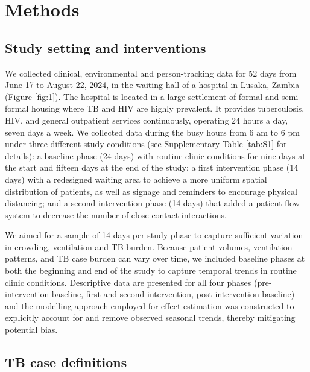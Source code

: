 \documentclass[11pt]{article}
\begin{document}
\section{Methods}\label{methods}

\subsection{Study setting and interventions}\label{study-setting-and-interventions}

We collected clinical, environmental and person-tracking data for 52 days from June 17 to August 22, 2024, in the waiting hall of a hospital in Lusaka, Zambia (Figure \ref{fig:1}). The hospital is located in a large settlement of formal and semi-formal housing where TB and HIV are highly prevalent. It provides tuberculosis, HIV, and general outpatient services continuously, operating 24 hours a day, seven days a week. We collected data during the busy hours from 6 am to 6 pm under three different study conditions (see Supplementary Table \ref{tab:S1} for details): a baseline phase (24 days) with routine clinic conditions for nine days at the start and fifteen days at the end of the study; a first intervention phase (14 days) with a redesigned waiting area to achieve a more uniform spatial distribution of patients, as well as signage and reminders to encourage physical distancing; and a second intervention phase (14 days) that added a patient flow system to decrease the number of close-contact interactions.

We aimed for a sample of 14 days per study phase to capture sufficient variation in crowding, ventilation and TB burden. Because patient volumes, ventilation patterns, and TB case burden can vary over time, we included baseline phases at both the beginning and end of the study to capture temporal trends in routine clinic conditions. Descriptive data are presented for all four phases (pre-intervention baseline, first and second intervention, post-intervention baseline) and the modelling approach employed for effect estimation was constructed to explicitly account for and remove observed seasonal trends, thereby mitigating potential bias.

\subsection{TB case definitions}\label{tb-case-definitions}
\end{document}
